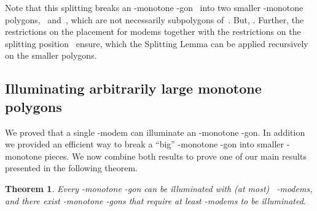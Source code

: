 \documentclass[A4]{article}
\newtheorem{theorem}{Theorem}
\begin{document}
 
Note that this splitting breaks an -monotone -gon~ into two smaller -monotone polygons,~ and~, which are not necessarily subpolygons of~.
But, .
Further, the restrictions on the placement for modems together with the restrictions on the splitting position~ ensure, which the Splitting Lemma can be applied recursively on the smaller polygons.


\subsection{Illuminating arbitrarily large monotone polygons}
\label{sec:gmono-main}


We proved that a single \mbox{-modem} can illuminate an -monotone -gon.
In addition we provided an efficient way to break a ``big'' -monotone -gon into smaller -monotone pieces.
We now combine both results to prove one of our main results presented in the following theorem.


\begin{theorem}\label{thm:gmono-generalbound}
Every -monotone -gon can be illuminated with (at most) ~\mbox{-modems}, and there exist -monotone -gons that require at least  \mbox{-modems} to be illuminated.
\end{theorem}
\end{document}
